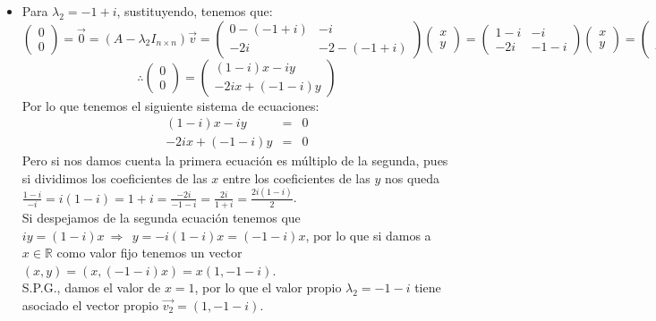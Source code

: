 \begin{enumerate}
\begin{itemize}
\item Para $\lambda_2=-1+i$, sustituyendo, tenemos que:
    \[\begin{pmatrix}0\\
0\end{pmatrix}=\vec{0}=(A-\lambda_2I_{n\times n })\vec{v}=\begin{pmatrix}0-(-1+i) &-i\\
-2i &-2-(-1+i)\end{pmatrix}\begin{pmatrix}x\\
y\end{pmatrix}=\begin{pmatrix}1-i &-i\\
-2i &-1-i\end{pmatrix}\begin{pmatrix}x\\
y\end{pmatrix}=\begin{pmatrix}(1-i)x-iy\\
-2ix+(-1-i)y\end{pmatrix}\]
\[\therefore \begin{pmatrix}0\\
0\end{pmatrix}=\begin{pmatrix}(1-i)x-iy\\
-2ix+(-1-i)y\end{pmatrix}\]
Por lo que tenemos el siguiente sistema de ecuaciones:
\begin{eqnarray*}
(1-i)x-iy&=&0\\
-2ix+(-1-i)y&=&0
\end{eqnarray*}
Pero si nos damos cuenta la primera ecuaci\'on es m\'ultiplo de la segunda, pues si dividimos los coeficientes de las $x$ entre los coeficientes de las $y$ nos queda $\displaystyle\frac{1-i}{-i}=i(1-i)=1+i=\frac{-2i}{-1-i}=\frac{2i}{1+i}=\frac{2i(1-i)}{2}$.\\
Si despejamos de la segunda ecuaci\'on tenemos que $iy=(1-i)x~\Longrightarrow~~y=-i(1-i)x=(-1-i)x$, por lo que si damos a $x\in\mathbb{R}$ como valor fijo tenemos un vector $(x,y)=(x,(-1-i)x)=x(1,-1-i)$.\\
S.P.G., damos el valor de $x=1$, por lo que el valor propio $\lambda_2=-1-i$ tiene asociado el vector propio $\vec{v_2}=(1,-1-i)$.
\end{itemize}



\end{enumerate}
